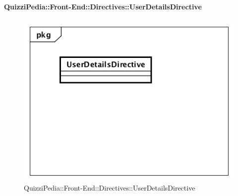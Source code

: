 \paragraph{QuizziPedia::Front-End::Directives::UserDetailsDirective}

\label{QuizziPedia::Front-End::Directives::UserDetailsDirective}

\begin{figure}[h]
	\centering
	\includegraphics[scale=0.5,keepaspectratio]{UML/Classi/Front-End/QuizziPedia_Front-end_Directives_UserDetailsDirective.png}
	\caption{QuizziPedia::Front-End::Directives::UserDetailsDirective}
\end{figure}

